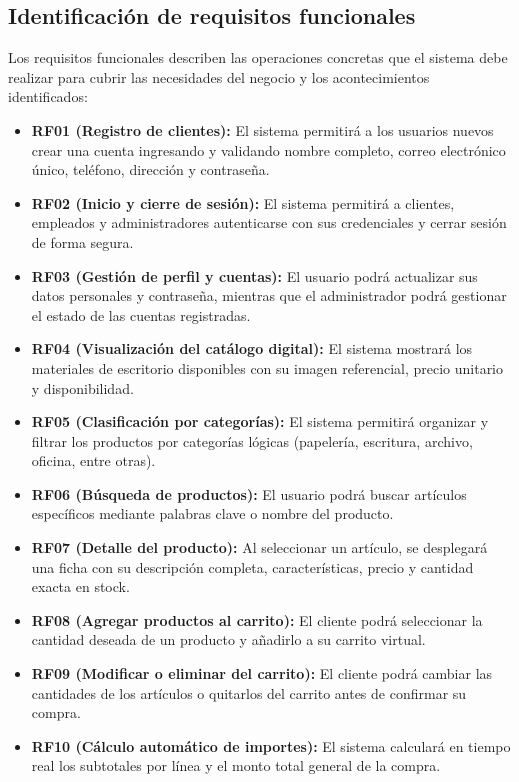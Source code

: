 \subsection{Identificación de requisitos funcionales}
Los requisitos funcionales describen las operaciones concretas que el sistema debe realizar para cubrir las necesidades del negocio y los acontecimientos identificados:

\begin{itemize}
    \item \textbf{RF01 (Registro de clientes):} El sistema permitirá a los usuarios nuevos crear una cuenta ingresando y validando nombre completo, correo electrónico único, teléfono, dirección y contraseña.
    \item \textbf{RF02 (Inicio y cierre de sesión):} El sistema permitirá a clientes, empleados y administradores autenticarse con sus credenciales y cerrar sesión de forma segura.
    \item \textbf{RF03 (Gestión de perfil y cuentas):} El usuario podrá actualizar sus datos personales y contraseña, mientras que el administrador podrá gestionar el estado de las cuentas registradas.
    \item \textbf{RF04 (Visualización del catálogo digital):} El sistema mostrará los materiales de escritorio disponibles con su imagen referencial, precio unitario y disponibilidad.
    \item \textbf{RF05 (Clasificación por categorías):} El sistema permitirá organizar y filtrar los productos por categorías lógicas (papelería, escritura, archivo, oficina, entre otras).
    \item \textbf{RF06 (Búsqueda de productos):} El usuario podrá buscar artículos específicos mediante palabras clave o nombre del producto.
    \item \textbf{RF07 (Detalle del producto):} Al seleccionar un artículo, se desplegará una ficha con su descripción completa, características, precio y cantidad exacta en stock.
    \item \textbf{RF08 (Agregar productos al carrito):} El cliente podrá seleccionar la cantidad deseada de un producto y añadirlo a su carrito virtual.
    \item \textbf{RF09 (Modificar o eliminar del carrito):} El cliente podrá cambiar las cantidades de los artículos o quitarlos del carrito antes de confirmar su compra.
    \item \textbf{RF10 (Cálculo automático de importes):} El sistema calculará en tiempo real los subtotales por línea y el monto total general de la compra.

\end{itemize}
